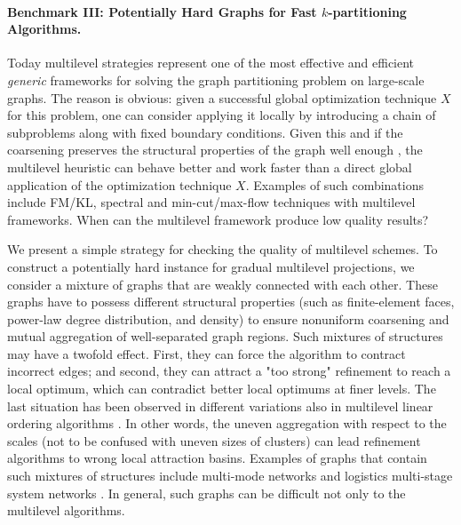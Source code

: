\documentclass{llncs}
\begin{document}
\paragraph{Benchmark III: Potentially Hard Graphs for Fast $k$-partitioning Algorithms.}  Today multilevel strategies represent one of the most effective and efficient \emph{generic} frameworks for solving the graph partitioning problem on large-scale graphs. 
The reason is obvious: given a successful global optimization technique $X$ for this problem, one can consider applying it locally by introducing a chain of subproblems along with fixed boundary conditions. 
 Given this and if the coarsening preserves the structural properties of the graph well enough 
, the multilevel heuristic can behave better and work faster
than a direct global application of the optimization technique $X$. 
Examples of such combinations include FM/KL, spectral and min-cut/max-flow techniques with multilevel frameworks. When can the multilevel framework produce low quality results?
\par We present a simple strategy for checking the quality of multilevel schemes. 
To construct a potentially hard instance for gradual multilevel projections, we consider a mixture of graphs that are weakly connected with each other. 
These graphs have to possess different structural properties (such as finite-element faces, power-law degree distribution, and density) to ensure nonuniform coarsening and mutual aggregation of well-separated graph regions. Such mixtures of structures may have a twofold effect. First, they can force the algorithm to contract incorrect edges; and second, they can attract a "too strong" refinement to reach a local optimum, which can contradict better local optimums at finer levels. The last situation has been observed in different variations also in multilevel linear ordering algorithms \cite{safro2005}.
In other words, the uneven aggregation with respect to the scales (not to be confused with uneven sizes of clusters) can lead refinement algorithms to wrong local attraction basins. Examples of graphs that contain such mixtures of structures include multi-mode networks \cite{multimode} and logistics multi-stage system networks \cite{stock2006strategic}. In general, such graphs can be difficult not only to the multilevel algorithms.
\end{document}
